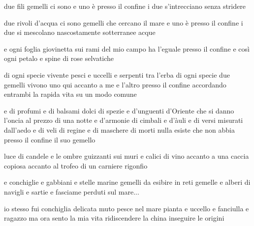 
\begin{poem}
	\begin{stanza}
		due fili gemelli ci sono\verseline
		e uno è presso il confine\verseline
		i due s’intrecciano\verseline
		senza stridere
	\end{stanza}

	\begin{stanza}
		due rivoli d’acqua ci sono\verseline
		gemelli che cercano il mare\verseline
		e uno è presso il confine\verseline
		i due si mescolano\verseline
		nascostamente\verseline
		sotterranee acque
	\end{stanza}

	\begin{stanza}
		e ogni foglia giovinetta sui rami\verseline
		del mio campo\verseline
		ha l’eguale presso il confine\verseline
		e così ogni petalo e spine\verseline
		di rose selvatiche
	\end{stanza}

	\begin{stanza}
		di ogni specie vivente\verseline
		pesci e uccelli e serpenti tra l’erba\verseline
		di ogni specie due gemelli vivono\verseline
		uno qui accanto a me\verseline
		e l’altro presso il confine\verseline
		accordando entrambi la rapida vita\verseline
		su un modo comune
	\end{stanza}

	\begin{stanza}
		e di profumi e di balsami dolci\verseline
		di spezie e d’unguenti d’Oriente\verseline
		che si danno l’oncia al prezzo\verseline
		di una notte\verseline
		e d’armonie di cimbali e d’àuli\verseline
		e di versi misurati dall’aedo\verseline
		e di veli di regine\verseline
		e di maschere di morti\verseline
		nulla esiste che non abbia
		presso il confine il suo gemello
	\end{stanza}

	\begin{stanza}
		luce di candele\verseline
		e le ombre\verseline
		guizzanti sui muri\verseline
		e calici di vino\verseline
		accanto a una caccia copiosa\verseline
		accanto al trofeo di un carniere rigonfio
	\end{stanza}

	\begin{stanza}
		e conchiglie e gabbiani e stelle marine\verseline
		gemelli da esibire in reti gemelle\verseline
		e alberi di navigli e sartie e fasciame\verseline
		perduti sul mare...
	\end{stanza}

	\begin{stanza}
		io stesso fui\verseline
		conchiglia delicata\verseline
		muto pesce nel mare\verseline
		pianta e uccello\verseline
		e fanciulla e ragazzo\verseline
		ma ora sento la mia vita\verseline
		ridiscendere la china\verseline
		inseguire le origini
	\end{stanza}
\end{poem}

